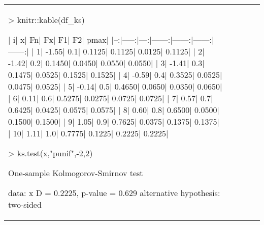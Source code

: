 \documentclass[10pt,spanish,es-nodecimaldot]{article}
\begin{document}
\begin{tabular}{l||llll}
\begin{Schunk}
\begin{Sinput}
> knitr::kable(df_ks)
\end{Sinput}
\begin{Soutput}
|  i|     x|  Fn|     Fx|     F1|     F2|   pmax|
|--:|-----:|---:|------:|------:|------:|------:|
|  1| -1.55| 0.1| 0.1125| 0.1125| 0.0125| 0.1125|
|  2| -1.42| 0.2| 0.1450| 0.0450| 0.0550| 0.0550|
|  3| -1.41| 0.3| 0.1475| 0.0525| 0.1525| 0.1525|
|  4| -0.59| 0.4| 0.3525| 0.0525| 0.0475| 0.0525|
|  5| -0.14| 0.5| 0.4650| 0.0650| 0.0350| 0.0650|
|  6|  0.11| 0.6| 0.5275| 0.0275| 0.0725| 0.0725|
|  7|  0.57| 0.7| 0.6425| 0.0425| 0.0575| 0.0575|
|  8|  0.60| 0.8| 0.6500| 0.0500| 0.1500| 0.1500|
|  9|  1.05| 0.9| 0.7625| 0.0375| 0.1375| 0.1375|
| 10|  1.11| 1.0| 0.7775| 0.1225| 0.2225| 0.2225|
\end{Soutput}
\end{Schunk}

\begin{Schunk}
\begin{Sinput}
> ks.test(x,"punif",-2,2)
\end{Sinput}
\begin{Soutput}
	One-sample Kolmogorov-Smirnov test

data:  x
D = 0.2225, p-value = 0.629
alternative hypothesis: two-sided
\end{Soutput}
\end{Schunk}


\end{tabular}
\end{document}
